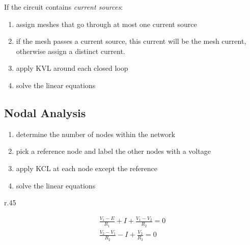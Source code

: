 	If the circuit contains \emph{current sources}:
	\begin{enumerate}
		\item assign meshes that go through at most one current source
		\item if the mesh passes a current source, this current will be the mesh current, otherwise assign a distinct current.
		\item apply KVL around each closed loop
		\item solve the linear equations
	\end{enumerate}
	

\subsection{Nodal Analysis} %
	
	\begin{enumerate}
		\item determine the number of nodes within the network
		\item pick a reference node and label the other nodes with a voltage
		\item apply KCL at each node except the reference
		\item solve the linear equations
	\end{enumerate}
	
	\begin{wrapfigure}[0]{r}{.45\columnwidth}
		\vspace{-1.2cm}
	\end{wrapfigure}
	
	\begin{gather*}
		\frac{V_1 - E}{R_1} + I + \frac{V_1-V_2}{R_2} = 0 \\
		\frac{V_2 - V_1}{R_2} - I + \frac{V_2}{R_3} = 0
	\end{gather*}
	
	\hspace{2pt}
